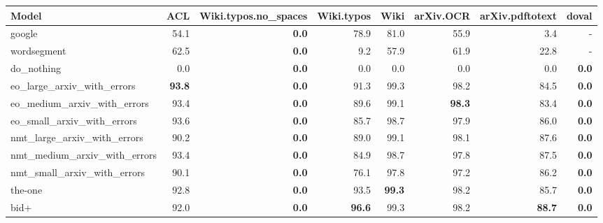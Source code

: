 \begin{tabular}{lrrrrrrr} \hline
Model & ACL & Wiki.typos.no\_spaces & Wiki.typos & Wiki & arXiv.OCR & arXiv.pdftotext & doval \\ \hline
google & 54.1 & \textbf{0.0} & 78.9 & 81.0 & 55.9 & 3.4 & - \\ 
wordsegment & 62.5 & \textbf{0.0} & 9.2 & 57.9 & 61.9 & 22.8 & - \\ 
do\_nothing & 0.0 & \textbf{0.0} & 0.0 & 0.0 & 0.0 & 0.0 & \textbf{0.0} \\ \hline
eo\_large\_arxiv\_with\_errors & \textbf{93.8} & \textbf{0.0} & 91.3 & 99.3 & 98.2 & 84.5 & \textbf{0.0} \\ 
eo\_medium\_arxiv\_with\_errors & 93.4 & \textbf{0.0} & 89.6 & 99.1 & \textbf{98.3} & 83.4 & \textbf{0.0} \\ 
eo\_small\_arxiv\_with\_errors & 93.6 & \textbf{0.0} & 85.7 & 98.7 & 97.9 & 86.0 & \textbf{0.0} \\ \hline
nmt\_large\_arxiv\_with\_errors & 90.2 & \textbf{0.0} & 89.0 & 99.1 & 98.1 & 87.6 & \textbf{0.0} \\ 
nmt\_medium\_arxiv\_with\_errors & 93.4 & \textbf{0.0} & 84.9 & 98.7 & 97.8 & 87.5 & \textbf{0.0} \\ 
nmt\_small\_arxiv\_with\_errors & 90.1 & \textbf{0.0} & 76.1 & 97.8 & 97.2 & 86.2 & \textbf{0.0} \\ \hline
the-one & 92.8 & \textbf{0.0} & 93.5 & \textbf{99.3} & 98.2 & 85.7 & \textbf{0.0} \\ 
bid+ & 92.0 & \textbf{0.0} & \textbf{96.6} & 99.3 & 98.2 & \textbf{88.7} & \textbf{0.0} \\ \hline
\end{tabular}